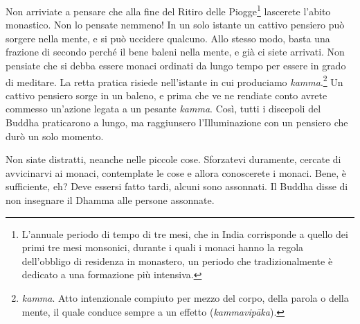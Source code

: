 Non arriviate a pensare che alla fine del Ritiro delle Piogge\footnote{L'annuale
  periodo di tempo di tre mesi, che in India corrisponde a quello dei
  primi tre mesi monsonici, durante i quali i monaci hanno la regola
  dell'obbligo di residenza in monastero, un periodo che
  tradizionalmente è dedicato a una formazione più intensiva.} lascerete
l'abito monastico. Non lo pensate nemmeno! In un solo istante un cattivo
pensiero può sorgere nella mente, e si può uccidere qualcuno. Allo
stesso modo, basta una frazione di secondo perché il bene baleni nella
mente, e già ci siete arrivati. Non pensiate che si debba essere monaci
ordinati da lungo tempo per essere in grado di meditare. La retta
pratica risiede nell'istante in cui produciamo \emph{kamma}.\footnote{\emph{kamma}.
  Atto intenzionale compiuto per mezzo del corpo, della parola o della
  mente, il quale conduce sempre a un effetto (\emph{kammavipāka}).} Un
cattivo pensiero sorge in un baleno, e prima che ve ne rendiate conto
avrete commesso un'azione legata a un pesante \emph{kamma}. Così, tutti
i discepoli del Buddha praticarono a lungo, ma raggiunsero
l'Illuminazione con un pensiero che durò un solo momento.

Non siate distratti, neanche nelle piccole cose. Sforzatevi duramente,
cercate di avvicinarvi ai monaci, contemplate le cose e allora
conoscerete i monaci. Bene, è sufficiente, eh? Deve essersi fatto tardi,
alcuni sono assonnati. Il Buddha disse di non insegnare il Dhamma alle
persone assonnate.
